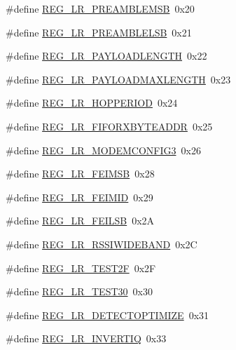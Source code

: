\begin{DoxyCompactItemize}
\item 
\#define \hyperlink{sx1276Regs-LoRa_8h_a786457a6b4788117f8a2b994e68344ba}{R\+E\+G\+\_\+\+L\+R\+\_\+\+P\+R\+E\+A\+M\+B\+L\+E\+M\+SB}~0x20
\item 
\#define \hyperlink{sx1276Regs-LoRa_8h_a4449a1e2b055269d13034ebb4ba705b2}{R\+E\+G\+\_\+\+L\+R\+\_\+\+P\+R\+E\+A\+M\+B\+L\+E\+L\+SB}~0x21
\item 
\#define \hyperlink{sx1276Regs-LoRa_8h_a702e1e9ac301d26eb08fed50b90c6718}{R\+E\+G\+\_\+\+L\+R\+\_\+\+P\+A\+Y\+L\+O\+A\+D\+L\+E\+N\+G\+TH}~0x22
\item 
\#define \hyperlink{sx1276Regs-LoRa_8h_ae71e7acfa7c8c737e55349e72c71349f}{R\+E\+G\+\_\+\+L\+R\+\_\+\+P\+A\+Y\+L\+O\+A\+D\+M\+A\+X\+L\+E\+N\+G\+TH}~0x23
\item 
\#define \hyperlink{sx1276Regs-LoRa_8h_a829b59cc8b18d86904af96d1dc60add2}{R\+E\+G\+\_\+\+L\+R\+\_\+\+H\+O\+P\+P\+E\+R\+I\+OD}~0x24
\item 
\#define \hyperlink{sx1276Regs-LoRa_8h_a71cd184cd1fae95aeb458d8361d51cdd}{R\+E\+G\+\_\+\+L\+R\+\_\+\+F\+I\+F\+O\+R\+X\+B\+Y\+T\+E\+A\+D\+DR}~0x25
\item 
\#define \hyperlink{sx1276Regs-LoRa_8h_aecf214e63c69601e543629269b0401c7}{R\+E\+G\+\_\+\+L\+R\+\_\+\+M\+O\+D\+E\+M\+C\+O\+N\+F\+I\+G3}~0x26
\item 
\#define \hyperlink{sx1276Regs-LoRa_8h_a71a7b80d5f8a8c64cd63ea8d81a33d26}{R\+E\+G\+\_\+\+L\+R\+\_\+\+F\+E\+I\+M\+SB}~0x28
\item 
\#define \hyperlink{sx1276Regs-LoRa_8h_a300ed0b1d23a5723176cfb26dcf2b32c}{R\+E\+G\+\_\+\+L\+R\+\_\+\+F\+E\+I\+M\+ID}~0x29
\item 
\#define \hyperlink{sx1276Regs-LoRa_8h_a515106b61bc60484b381cc58afa28b6e}{R\+E\+G\+\_\+\+L\+R\+\_\+\+F\+E\+I\+L\+SB}~0x2A
\item 
\#define \hyperlink{sx1276Regs-LoRa_8h_a98748f71ec5ffb1945bf8fa7a91a5d45}{R\+E\+G\+\_\+\+L\+R\+\_\+\+R\+S\+S\+I\+W\+I\+D\+E\+B\+A\+ND}~0x2C
\item 
\#define \hyperlink{sx1276Regs-LoRa_8h_af5f1829a69cb2a95243952ffa751a4c9}{R\+E\+G\+\_\+\+L\+R\+\_\+\+T\+E\+S\+T2F}~0x2F
\item 
\#define \hyperlink{sx1276Regs-LoRa_8h_a74451ab459bd0f482dde3ee50592390b}{R\+E\+G\+\_\+\+L\+R\+\_\+\+T\+E\+S\+T30}~0x30
\item 
\#define \hyperlink{sx1276Regs-LoRa_8h_a62883b6ca8e236af4d331a31e55c67b3}{R\+E\+G\+\_\+\+L\+R\+\_\+\+D\+E\+T\+E\+C\+T\+O\+P\+T\+I\+M\+I\+ZE}~0x31
\item 
\#define \hyperlink{sx1276Regs-LoRa_8h_afc2779efc44625851e1d056f48fa1f0c}{R\+E\+G\+\_\+\+L\+R\+\_\+\+I\+N\+V\+E\+R\+T\+IQ}~0x33

\end{DoxyCompactItemize}
